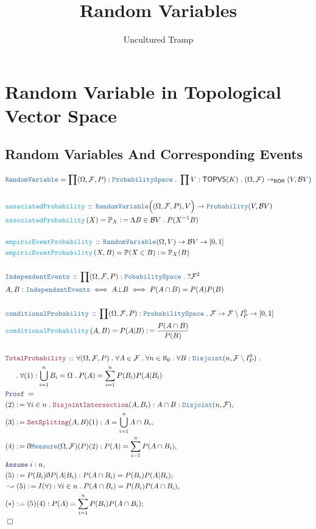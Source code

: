 \documentclass[12pt]{scrartcl}
\author{Uncultured Tramp}
\title{Random Variables}
\newcommand{\TYPE}[1]{\textcolor{NavyBlue}{\mathtt{#1}}}
\newcommand{\FUNC}[1]{\textcolor{Cerulean}{\mathtt{#1}}}
\newcommand{\LOGIC}[1]{\textcolor{Blue}{\mathtt{#1}}}
\newcommand{\THM}[1]{\textcolor{Maroon}{\mathtt{#1}}}
\renewcommand{\.}{\; . \;}
\newcommand{\de}{: \kern 0.1pc =}
\newcommand{\Act}[1]{\left( #1 \right)}
\newcommand{\Theorem}[2]{& \THM{#1} \, :: \, #2 \\ & \Proof = \\ }
\newcommand{\DeclareType}[2]{& \TYPE{#1} \, :: \, #2 \\}
\newcommand{\DefineNamedType}[4]{& #1 : \TYPE{#2} \iff #3 \iff #4 \\}
\newcommand{\DeclareFunc}[2]{& \FUNC{#1} \, :: \, #2 \\}
\newcommand{\DefineNamedFunc}[4]{&  \FUNC{#1}\Act{#2} = #3 \de #4 \\}
\newcommand{\NewLine}{\\ & \kern 1pc}
\newcommand{\Page}[1]{\begin{align*} #1 \end{align*}   }
\newcommand{ \bd }{ \ByDef }
\newcommand{\Say}[3]{& #1 \de #2 : #3, \\}
\newcommand{\Conclude}[3]{& #1 \de #2 : #3; \\}
\newcommand{\Derive}[3]{& \leadsto #1 \de #2 : #3, \\}
\newcommand{\A}{\LOGIC{Assume} \;}
\newcommand{\Assume}[2]{& \A #1 : #2, \\}
\newcommand{\QED}{\; \square}
\newcommand{\EndProof}{& \QED \\}
\newcommand{\ByDef}{\eth}
\newcommand{\Proof}{\LOGIC{Proof} \; }
\newcommand{\BOR}{\mathsf{BOR}}
\newcommand{\F}{\mathcal{F}}
\renewcommand{\O}{\Omega}
\newcommand{\B}{\mathcal{B}}
\renewcommand{\P}{\mathbb{P}}
\newcommand{\RV}{\TYPE{RandomVariable}}
\begin{document}
\maketitle
\newpage
\tableofcontents
\newpage
\section{Random Variable in Topological Vector Space}
\subsection{Random Variables And Corresponding Events}
\Page{
	& \RV  = \prod (\O,\F,P) : \TYPE{ProbabilitySpace} \. \prod V : \mathsf{TOPVS}(K)  \.  (\O,\F) \to_\BOR (V,\B V) \\ 
	\\
	\DeclareFunc{associatedProbability}{ \RV\Big( (\O,\F,P), V \Big) \to \TYPE{Probability}(V,\B V)  }
	\DefineNamedFunc{associatedProbability}{X}{\P_X}{\Lambda B \in \B V \.  P(X^{-1}B) }
	\\
	\DeclareFunc{empiricEventProbability}{\RV ( \O , V  ) \to \B V \to [0,1]}
	\DefineNamedFunc{empiricEventProbability}{X,B}{ \P(X \in B)  }{\P_X(B)}
	\\
	\DeclareType{IndependentEvents}{\prod (\O,\F,P) : \TYPE{PobabilitySpace} \. ? \F^2}
	\DefineNamedType{A,B}{IndependantEvents}{A \bot B}{ P(A \cap B ) = P(A)P(B)  }
	\\
	\DeclareType{conditionalProbability}{\prod (\O,\F,P) : \TYPE{ProbabilitySpace} \. \F \to \F \setminus I^0_P \to [0,1]}
	\DefineNamedFunc{conditionalProbability}{A,B}{P(A|B)}{\frac{P(A \cap B)}{P(B)}}
	\\
	\Theorem{TotalProbability}{
		\forall (\O,\F,P) \. 
		\forall A \in \F \. 
		\forall n \in \aleph_0 \. 
		\forall B : \TYPE{Disjoint}(n,\F \setminus I^0_P) \. \NewLine \.
		\forall (1) : \bigcup^n_{i = 1} B_i = \O \.
		P(A) = \sum^n_{i = 1} P(B_i)P(A|B_i)
	}
	\Say{ (2) }{\forall i \in n \. \THM{DisjointIntersection}(A,B_i)}{A \cap B : \TYPE{Disjoint}(n,\F)}
	\Say{ (3) }{\THM{SetSpliting}(A,B)(1)}{A = \bigcup^n_{i=1} A \cap B_i}
	\Say{(4)}{\bd \TYPE{Measure}(\O,\F)(P)(2)}{P(A) = \sum^n_{i=1} P(A \cap B_i)}
	\Assume{i}{n}
	\Conclude{(5)}{P(B_i)\bd P(A|B_i)}{P(A \cap B_i) = P(B_i)P(A|B_i)}
	\Derive{(5)}{I(\forall)}{ \forall i \in n \. P(A \cap B_i) = P(B_i)P(A \cap B_i )  }
	\Conclude{(*)}{(5)(4)}{P(A) = \sum_{i = 1}^n P(B_i) P(A \cap B_i)}
	\EndProof
}
\end{document}
